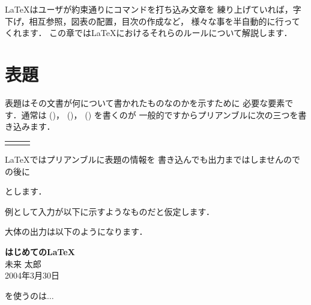 {\LaTeX}はユーザが約束通りにコマンドを打ち込み文章を
練り上げていれば，字下げ，相互参照，図表の配置，目次の作成など，
様々な事を半自動的に行ってくれます．%
この章では\LaTeX におけるそれらのルールについて解説します．


\section{表題}

%
{表題}はその文書が何について書かれたものなのかを示すために
必要な要素です．通常は ()， ()，
 () を書くのが
一般的ですからプリアンブルに次の三つを書き込みます．
\begin{Syntax}
\begin{tabular}{*3l}
\C{title}\pa{題名} & \C{author}\pa{作者} & \C{date}\pa{日付}\\
\end{tabular}
\end{Syntax}
{\LaTeX}ではプリアンブルに表題の情報を
書き込んでも出力まではしませんので\verb||
の後に
\begin{Syntax}
\end{Syntax}
とします．

例として入力が以下に示すようなものだと仮定します．


大体の出力は以下のようになります．

\begin{OutText}
\begin{center}
{\LARGE \textbf{はじめての\LaTeX }}\\[1.5em]
{\large 未来 太郎}\\[.7em]
{2004年3月30日}\\[.7em]
\end{center}
\quad {\LaTeX}を使うのは$\ldots$
\end{OutText}

